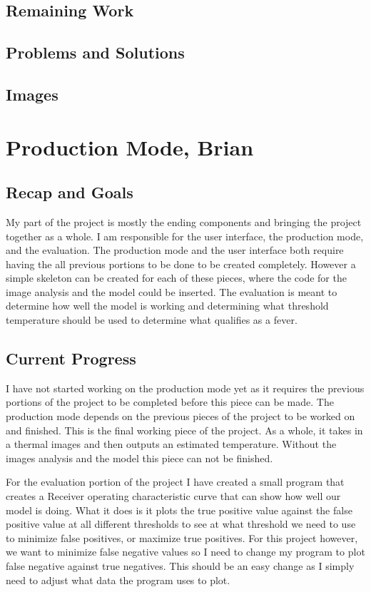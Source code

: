 \documentclass[onecolumn, draftclsnofoot,10pt, compsoc]{IEEEtran}
\begin{document}
\subsection{Remaining Work}


\subsection{Problems and Solutions}


\subsection{Images}

\section{Production Mode, Brian}

\subsection{Recap and Goals}
My part of the project is mostly the ending components and bringing the project together as a whole. I am responsible for the user interface, the production mode, and the evaluation. The production mode and the user interface both require having the all previous portions to be done to be created completely. However a simple skeleton can be created for each of these pieces, where the code for the image analysis and the model could be inserted. The evaluation is meant to determine how well the model is working and determining what threshold temperature should be used to determine what qualifies as a fever.

\subsection{Current Progress}
I have not started working on the production mode yet as it requires the previous portions of the project to be completed before this piece can be made. The production mode depends on the previous pieces of the project to be worked on and finished. This is the final working piece of the project. As a whole, it takes in a thermal images and then outputs an estimated temperature. Without the images analysis and the model this piece can not be finished.

For the evaluation portion of the project I have created a small program that creates a Receiver operating characteristic curve that can show how well our model is doing. What it does is it plots the true positive value against the false positive value at all different thresholds to see at what threshold we need to use to minimize false positives, or maximize true positives. For this project however, we want to minimize false negative values so I need to change my program to plot false negative against true negatives. This should be an easy change as I simply need to adjust what data the program uses to plot.
\end{document}
